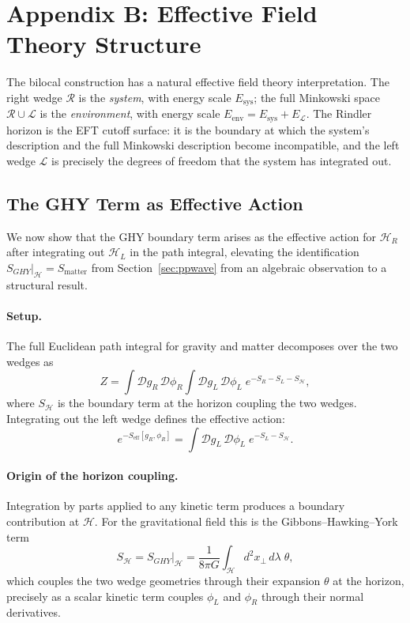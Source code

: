 \section{Appendix B: Effective Field Theory Structure}
\label{sec:eft}

The bilocal construction has a natural effective 
field theory interpretation. The right wedge 
$\mathcal{R}$ is the \emph{system}, with energy 
scale $E_{\text{sys}}$; the full Minkowski space 
$\mathcal{R} \cup \mathcal{L}$ is the 
\emph{environment}, with energy scale 
$E_{\text{env}} = E_{\text{sys}} + E_\mathcal{L}$. 
The Rindler horizon is the EFT cutoff surface: 
it is the boundary at which the system's 
description and the full Minkowski description 
become incompatible, and the left wedge 
$\mathcal{L}$ is precisely the degrees of freedom 
that the system has integrated out.

\subsection{The GHY Term as Effective Action}
\label{sec:eft_ghy}

We now show that the GHY boundary term arises 
as the effective action for $\mathcal{H}_R$ after 
integrating out $\mathcal{H}_L$ in the path 
integral, elevating the identification 
$S_{GHY}|_\mathcal{H} = S_{\text{matter}}$ from 
Section~\ref{sec:ppwave} from an algebraic 
observation to a structural result.

\paragraph{Setup.}
The full Euclidean path integral for gravity and 
matter decomposes over the two wedges as
%
\begin{equation}
Z = \int \mathcal{D}g_R\,\mathcal{D}\phi_R
    \int \mathcal{D}g_L\,\mathcal{D}\phi_L\;
    e^{-S_R - S_L - S_{\mathcal{H}}},
\end{equation}
%
where $S_{\mathcal{H}}$ is the boundary term at 
the horizon coupling the two wedges. Integrating 
out the left wedge defines the effective action:
%
\begin{equation}
e^{-S_{\text{eff}}[g_R,\phi_R]}
= \int \mathcal{D}g_L\,\mathcal{D}\phi_L\;
  e^{-S_L - S_{\mathcal{H}}}.
\label{eq:eff_action_def}
\end{equation}

\paragraph{Origin of the horizon coupling.}
Integration by parts applied to any kinetic term 
produces a boundary contribution at $\mathcal{H}$. 
For the gravitational field this is the 
Gibbons--Hawking--York term~\cite{gibbons1977action}
%
\begin{equation}
S_{\mathcal{H}} = S_{GHY}\big|_{\mathcal{H}} 
= \frac{1}{8\pi G}\int_{\mathcal{H}} 
  d^2x_\perp\,d\lambda\;\theta,
\end{equation}
%
which couples the two wedge geometries through 
their expansion $\theta$ at the horizon, precisely 
as a scalar kinetic term couples $\phi_L$ and 
$\phi_R$ through their normal derivatives.

